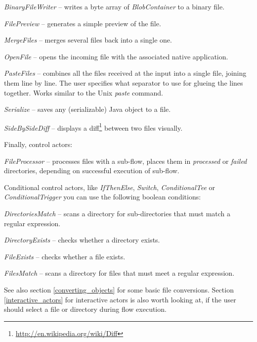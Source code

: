 \begin{tight_itemize}
	\item \textit{BinaryFileWriter} -- writes a byte array of 
	\textit{BlobContainer} to a binary file.
	\item \textit{FilePreview} -- generates a simple preview of the file.
	\item \textit{MergeFiles} -- merges several files back into a single one.
	\item \textit{OpenFile} -- opens the incoming file with the associated
	native application.
	\item \textit{PasteFiles} -- combines all the files received at the input into
	a single file, joining them line by line. The user specifies what separator to
	use for glueing the lines together. Works similar to the Unix \textit{paste}
	command.
	\item \textit{Serialize} -- saves any (serializable) Java object to a file.
	\item \textit{SideBySideDiff} -- displays a diff\footnote{\url{http://en.wikipedia.org/wiki/Diff}{}} 
	between two files visually.
\end{tight_itemize}
Finally, control actors:
\begin{tight_itemize}
	\item \textit{FileProcessor} -- processes files with a sub-flow, places
	them in \textit{processed} or \textit{failed} directories, depending on
	successful execution of sub-flow.
\end{tight_itemize}
Conditional control actors, like \textit{IfThenElse}, \textit{Switch}, 
\textit{ConditionalTee} or \textit{ConditionalTrigger} you can use the following
boolean conditions:
\begin{tight_itemize}
	\item \textit{DirectoriesMatch} -- scans a directory for sub-directories 
	that must match a regular expression.
	\item \textit{DirectoryExists} -- checks whether a directory exists.
	\item \textit{FileExists} -- checks whether a file exists.
	\item \textit{FilesMatch} -- scans a directory for files that must meet
	a regular expression.
\end{tight_itemize}
See also section \ref{converting_objects} for some basic file conversions.
Section \ref{interactive_actors} for interactive actors is also worth looking
at, if the user should select a file or directory during flow execution.

